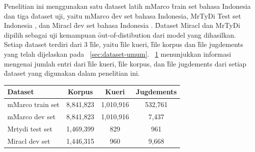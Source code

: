 Penelitian ini menggunakan satu \f{dataset} latih mMarco \f{train set} bahasa Indonesia \citep{mmarco} dan tiga \f{dataset} uji, yaitu mMarco \f{dev set} bahasa Indonesia, MrTyDi Test set Indonesia \citep{mrtydi}, dan Miracl \f{dev set} bahasa Indonesia \citep{miracl}. \f{Dataset} Miracl dan MrTyDi dipilih sebagai uji kemampuan \f{out-of-distibution} dari model yang dihasilkan. Setiap \f{dataset} terdiri dari 3 \f{file}, yaitu \f{file} kueri, \f{file} korpus dan \f{file jugdements} yang telah dijelaskan pada \sect~\ref{sec:dataset-umum}. \tab~\ref{tab:dataset-info} menunjukkan informasi mengenai jumlah entri dari \f{file} kueri, \f{file korpus}, dan \f{file jugdements} dari setiap \f{dataset} yang digunakan dalam penelitian ini.
\begin{table}
    \centering
    \label{tab:dataset-info}
    \begin{tabular}{|l|c|c|c|} \hline
        \textbf{Dataset} & \textbf{Korpus} & \textbf{Kueri} & \textbf{Jugdements} \\ \hline
        mMarco train set & 8,841,823       & 1,010,916      & 532,761             \\ \hline
        mMarco dev set   & 8,841,823       & 1,010,916      & 7,437               \\ \hline
        Mrtydi test set  & 1,469,399       & 829            & 961                 \\ \hline
        Miracl dev set   & 1,446,315       & 960            & 9,668               \\ \hline
    \end{tabular}
\end{table}

